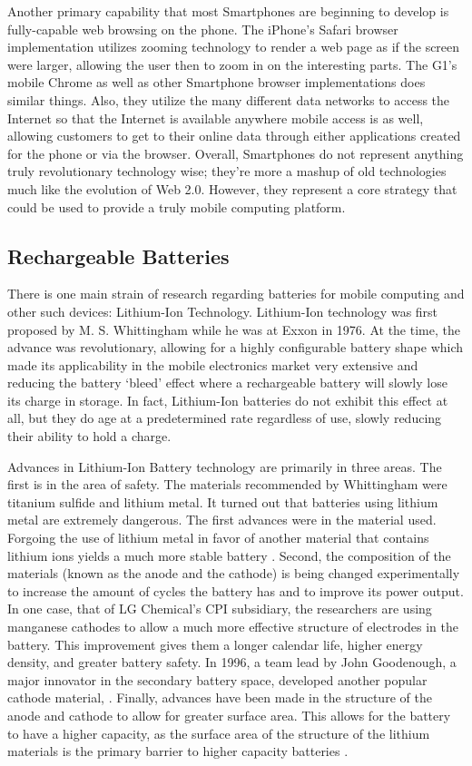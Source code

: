 Another primary capability that most Smartphones are beginning to develop is
fully-capable web browsing on the phone.  The iPhone's Safari browser
implementation utilizes zooming technology to render a web page as if the screen
were larger, allowing the user then to zoom in on the interesting parts.  The
G1's mobile Chrome as well as other Smartphone browser implementations does
similar things.  Also, they utilize the many different data networks to access
the Internet so that the Internet is available anywhere mobile access is as
well, allowing customers to get to their online data through either applications
created for the phone or via the browser.  Overall, Smartphones do not represent
anything truly revolutionary technology wise; they're more a mashup of old
technologies much like the evolution of Web 2.0.  However, they represent a core
strategy that could be used to provide a truly mobile computing platform.

\subsection{Rechargeable Batteries}
\label{sec:batteryLiterature}

There is one main strain of research regarding batteries for mobile computing
and other such devices: Lithium-Ion Technology.  Lithium-Ion technology was
first proposed by M. S. Whittingham while he was at Exxon in 1976.  At the time,
the advance was revolutionary, allowing for a highly configurable battery shape
which made its applicability in the mobile electronics market very extensive and
reducing the battery `bleed' effect where a rechargeable battery will slowly
lose its charge in storage.  In fact, Lithium-Ion batteries do not exhibit this
effect at all, but they do age at a predetermined rate regardless of use, slowly
reducing their ability to hold a charge.

Advances in Lithium-Ion Battery technology are primarily in three areas.  The
first is in the area of safety.  The materials recommended by Whittingham were
titanium sulfide and lithium metal.  It turned out that batteries using lithium
metal are extremely dangerous.  The first advances were in the material used.
Forgoing the use of lithium metal in favor of another material that contains
lithium ions yields a much more stable battery \citep{samar1981}.  Second, the
composition of the materials (known as the anode and the cathode) is being
changed experimentally to increase the amount of cycles the battery has and to
improve its power output.  In one case, that of LG Chemical's CPI subsidiary,
the researchers are using manganese cathodes to allow a much more effective
structure of electrodes in the battery.  This improvement gives them a longer
calendar life, higher energy density, and greater battery safety.  In 1996, a
team lead by John Goodenough, a major innovator in the secondary battery space,
developed another popular cathode material, .  Finally, advances have
been made in the structure of the anode and cathode to allow for greater surface
area.  This allows for the battery to have a higher capacity, as the surface
area of the structure of the lithium materials is the primary barrier to higher
capacity batteries \citep{idota1997}.


